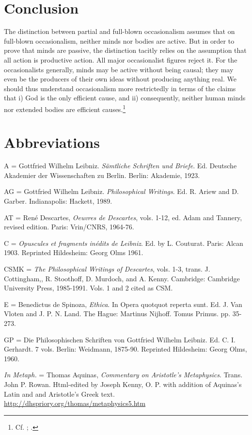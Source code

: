 \section{Conclusion}
The distinction between partial and full-blown occasionalism assumes that on full-blown occasionalism, neither minds nor bodies are active. But in order to prove that minds are passive, the distinction tacitly relies on the assumption that all action is productive action. All major occasionalist figures reject it. For the occasionalists generally, minds may be active without being causal; they may even be the producers of their own ideas without producing anything real. We should thus understand occasionalism more restrictedly in terms of the claims that i) God is the only efficient cause, and ii) consequently, neither human minds nor extended bodies are efficient causes.\footnote{Cf. \autocite[625-626]{Platt2011}; \autocite[101]{Gouhier1926}.}
\section{Abbreviations}

A = Gottfried Wilhelm Leibniz. \emph{Sämtliche Schriften und Briefe}.
Ed. Deutsche Akademier der Wissenschaften zu Berlin. Berlin: Akademie,
1923.

AG = Gottfried Wilhelm Leibniz. \emph{Philosophical Writings}. Ed. R.
Ariew and D. Garber. Indianapolis: Hackett, 1989.

AT = René Descartes, \emph{Oeuvres de Descartes}, vols. 1-12, ed. Adam
and Tannery, revised edition. Paris: Vrin/CNRS, 1964-76.

C = \emph{Opuscules et fragments inédits de Leibniz}. Ed. by L.
Couturat. Paris: Alcan 1903. Reprinted Hildesheim: Georg Olms 1961.

CSMK = \emph{The Philosophical Writings of Descartes}, vols. 1-3, trans.
J. Cottingham,, R. Stoothoff, D. Murdoch, and A. Kenny. Cambridge:
Cambridge University Press, 1985-1991. Vols. 1 and 2 cited as CSM.

E = Benedictus de Spinoza, \emph{Ethica}. In Opera quotquot reperta
sunt. Ed. J. Van Vloten and J. P. N. Land. The Hague: Martinus Nijhoff.
Tomus Primus. pp. 35-273.

GP = Die Philosophischen Schriften von Gottfried Wilhelm Leibniz. Ed. C.
I. Gerhardt. 7 vols. Berlin: Weidmann, 1875-90. Reprinted Hildesheim:
Georg Olms, 1960.

\emph{In Metaph.} = Thomas Aquinas, \emph{Commentary on Aristotle's
	Metaphysics}. Trans. John P. Rowan. Html-edited by Joseph Kenny, O. P.
with addition of Aquinas's Latin and and Aristotle's Greek text.
\url{http://dhspriory.org/thomas/metaphysics5.htm}

